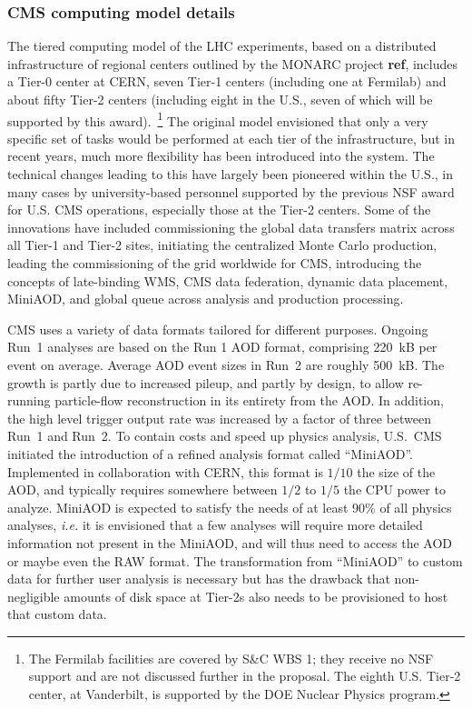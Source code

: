 \documentclass[11pt,a4paper]{article}
\begin{document}
\subsubsection{CMS computing model details}
\label{computingmodeldetails}
The tiered computing model of the LHC experiments, based on a distributed
infrastructure of regional centers outlined by the MONARC project {\bf
  ref}, includes a Tier-0 center at CERN, seven Tier-1 centers (including
one at Fermilab) and about fifty Tier-2 centers (including eight in the
U.S., seven of which will be supported by this award).~\footnote{The
  Fermilab facilities are covered by S\&C WBS 1; they receive no NSF
  support and are not discussed further in the proposal.  The eighth
  U.S. Tier-2 center, at Vanderbilt, is supported by the DOE Nuclear
  Physics program.}  The original model envisioned that only a very
specific set of tasks would be performed at each tier of the
infrastructure, but in recent years, much more flexibility has been
introduced into the system.  The technical changes leading to this have
largely been pioneered within the U.S., in many cases by university-based
personnel supported by the previous NSF award for U.S. CMS operations,
especially those at the Tier-2 centers.  Some of the innovations have
included commissioning the global data transfers matrix across all Tier-1
and Tier-2 sites, initiating the centralized Monte Carlo production,
leading the commissioning of the grid worldwide for CMS, introducing the
concepts of late-binding WMS, CMS data federation, dynamic data placement,
MiniAOD, and global queue across analysis and production processing.

CMS uses a variety of data formats tailored for different purposes.
Ongoing Run~1 analyses are based on the Run 1 AOD format, comprising 220~kB
per event on average.  Average AOD event sizes in Run~2 are roughly
500~kB. The growth is partly due to increased pileup, and partly by design,
to allow re-running particle-flow reconstruction in its entirety from the
AOD.  In addition, the high level trigger output rate was increased by a
factor of three between Run~1 and Run~2.  To contain costs and speed up
physics analysis, U.S.~CMS initiated the introduction of a refined analysis
format called ``MiniAOD''.  Implemented in collaboration with CERN, this
format is $1/10$ the size of the AOD, and typically requires somewhere
between $1/2$ to $1/5$ the CPU power to analyze. 
MiniAOD is expected to satisfy the needs of at least
90\% of all physics analyses, {\it i.e.} it is envisioned that a few analyses
will require more detailed information not present in the MiniAOD, and will
thus need to access the AOD or maybe even the RAW format.
The transformation from ``MiniAOD'' to custom data for further user
analysis is necessary but has the drawback that non-negligible amounts 
of disk space at Tier-2s also needs to be provisioned to host that custom data. 
\end{document}

